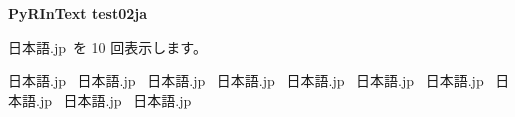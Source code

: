\documentclass[pdflatex, jadriver=standard]{bxjsarticle}
\begin{document}
{\Large\bf PyRInText test02ja}

日本語.jp~を 10 回表示します。\par \vspace{1mm}
日本語.jp~
日本語.jp~
日本語.jp~
日本語.jp~
日本語.jp~
日本語.jp~
日本語.jp~
日本語.jp~
日本語.jp~
日本語.jp~
\end{document}
